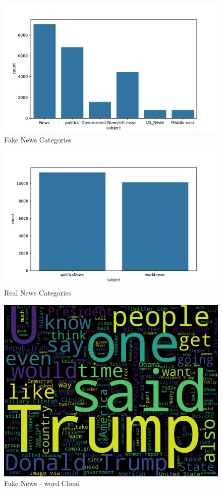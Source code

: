  \begin{figure}

     \centering
     \includegraphics[width=1\linewidth]{figures/FakeNewCategories.pdf}
     \caption{Fake News Categories}
     \label{fig:enter-label}
 \end{figure}
 \begin{figure}

     \centering
     \includegraphics[width=1\linewidth]{figures/RealNewsCategories.pdf}
     \caption{Real News Categories}
     \label{fig:enter-label}
 \end{figure}

\begin{figure}
    \centering
    \includegraphics[width=0.75\linewidth]{figures/fakenews_wordcloud.pdf}
    \caption{Fake News - word Cloud}
    \label{fig:enter-label}
\end{figure}

